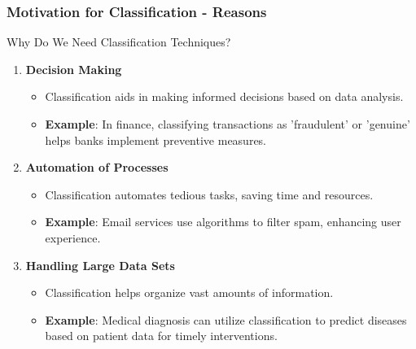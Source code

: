 \documentclass[aspectratio=169]{beamer}
\begin{document}
\begin{frame}[fragile]
    \frametitle{Motivation for Classification - Reasons}
    \begin{block}{Why Do We Need Classification Techniques?}
        \begin{enumerate}
            \item \textbf{Decision Making}
                \begin{itemize}
                    \item Classification aids in making informed decisions based on data analysis.
                    \item \textbf{Example}: In finance, classifying transactions as 'fraudulent' or 'genuine' helps banks implement preventive measures.
                \end{itemize}
                
            \item \textbf{Automation of Processes}
                \begin{itemize}
                    \item Classification automates tedious tasks, saving time and resources.
                    \item \textbf{Example}: Email services use algorithms to filter spam, enhancing user experience.
                \end{itemize}
                
            \item \textbf{Handling Large Data Sets}
                \begin{itemize}
                    \item Classification helps organize vast amounts of information.
                    \item \textbf{Example}: Medical diagnosis can utilize classification to predict diseases based on patient data for timely interventions.
                \end{itemize}
        \end{enumerate}
    \end{block}
\end{frame}
\end{document}

